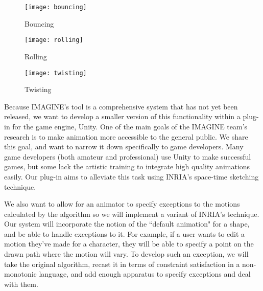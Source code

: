 \begin{figure}[!htb]
  \texttt{[image: bouncing]}
  \caption{Bouncing}\label{fig:bouncing}
\endminipage\hfill
{}
  \texttt{[image: rolling]}
  \caption{Rolling}\label{fig:rolling}
\endminipage\hfill
{}%
  \texttt{[image: twisting]}
  \caption{Twisting}\label{fig:twisting}
\endminipage
\end{figure}

Because IMAGINE's tool is a comprehensive system that has not yet been released, we want to develop a smaller version of this functionality within a plug-in for the game engine, Unity. One of the main goals of the IMAGINE team's research is to make animation more accessible to the general public. We share this goal, and want to narrow it down specifically to game developers. Many game developers (both amateur and professional) use Unity to make successful games, but some lack the artistic training to integrate high quality animations easily. Our plug-in aims to alleviate this task using INRIA's space-time sketching technique. 

We also want to allow for an animator to specify exceptions to the motions calculated by the algorithm so we will implement a variant of INRIA's technique. Our system will incorporate the notion of the ``default animation" for a shape, and be able to handle exceptions to it. For example, if a user wants to edit a motion they've made for a character, they will be able to specify a point on the drawn path where the motion will vary. To develop such an exception, we will take the original algorithm, recast it in  terms of constraint satisfaction in a non-monotonic language, and add enough apparatus to specify exceptions and deal with them.
